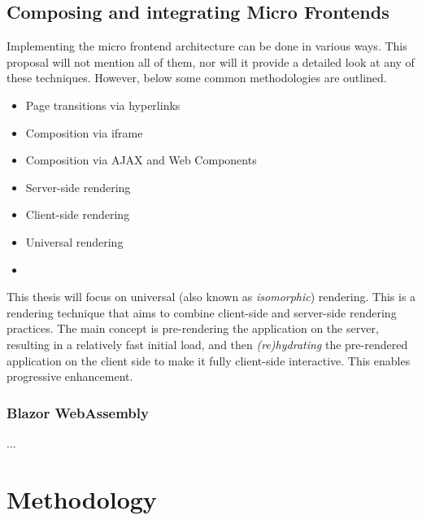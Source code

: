 \subsection{Composing and integrating Micro Frontends}
Implementing the micro frontend architecture can be done in various ways. This
proposal will not mention all of them, nor will it provide a detailed look at
any of these techniques. However, below some common methodologies are outlined.
\autocite{Geers_2020} \autocite{Peltonen_etal_2020} \autocite{Pavlenko_etal_2020}

\begin{itemize}
    \item Page transitions via hyperlinks
    \item Composition via iframe
    \item Composition via AJAX and Web Components
    \item Server-side rendering
    \item Client-side rendering
    \item Universal rendering
    \item[]
\end{itemize}

\noindent This thesis will focus on universal (also known as
\textit{isomorphic}) rendering. This is a rendering technique that aims to
combine client-side and server-side rendering practices. The main concept is
pre-rendering the application on the server, resulting in a relatively fast
initial load, and then \textit{(re)hydrating} the pre-rendered application on the
client side to make it fully client-side interactive. This enables progressive
enhancement. \autocite{MillerOsmani_2019}

\subsubsection{Blazor WebAssembly}
...




\section{Methodology}
\label{sec:methodology}



